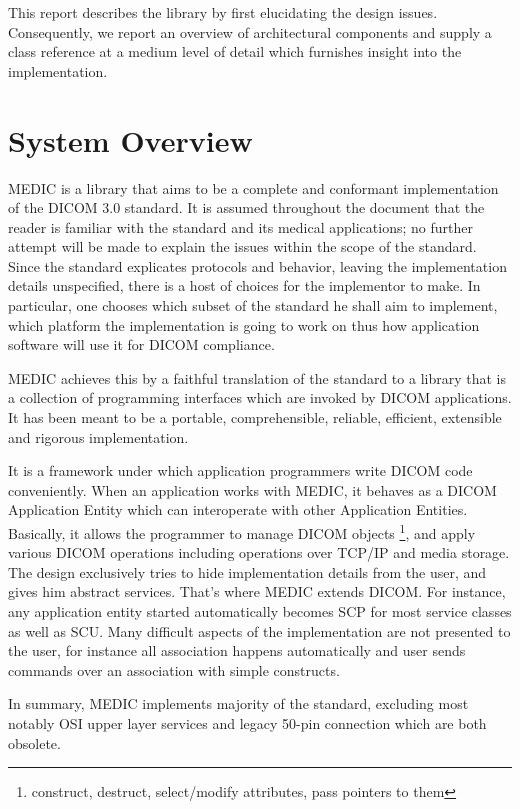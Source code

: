 \documentclass[a4paper,10pt]{article}
\begin{document}
This report describes the library by first
elucidating the design issues. Consequently, we 
report an overview of architectural components and supply a class
reference at a medium level of detail which furnishes insight into the
implementation.

\section{System Overview}

MEDIC is a library that aims to be a complete and conformant
implementation of the DICOM 3.0 standard. It is assumed throughout
the document that the reader is familiar with the standard and its medical
applications; no further attempt will be made to explain the issues within
the scope of the standard. Since the standard explicates protocols and
behavior, leaving the implementation details unspecified, there is a host
of choices for the implementor to make. In particular, one chooses
which subset of the standard he shall aim to implement, which platform
the implementation is going to work on thus how application software
will use it for DICOM compliance.

MEDIC achieves this by a faithful translation of the standard to
a library that is a collection of programming interfaces which
are invoked by DICOM applications. It has been meant to be a portable,
comprehensible, reliable, efficient, extensible and rigorous implementation.

It is a framework under which application programmers write DICOM
code conveniently. When an application works with MEDIC, 
it behaves as a DICOM Application Entity  which can interoperate
with other Application Entities. Basically, it allows the programmer
to manage DICOM objects \footnote{construct, destruct, select/modify
attributes, pass pointers to them}, and apply various
DICOM operations including operations over TCP/IP and media storage.
The design exclusively tries to hide implementation details from the
user, and gives him abstract services. That's where MEDIC extends
DICOM. For instance, any application entity started automatically
becomes SCP for most service classes as well as SCU. Many difficult
aspects of the implementation are not presented to the user, for
instance all association happens automatically and user sends commands
over an association with simple constructs.

In summary, MEDIC implements majority of the standard, excluding
most notably OSI upper layer services and legacy 50-pin connection
which are both obsolete.
\end{document}
